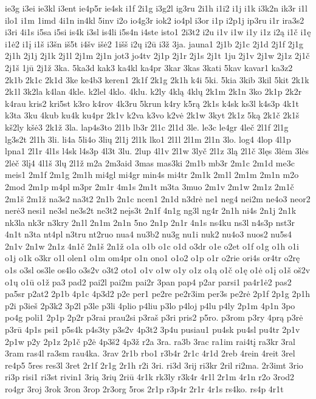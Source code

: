 {ie3g
i3ei
ie3kl
i3ent
ie4p5r
ie4sk
i1f
2i1g
i3g2l
ig3ru
2i1h
i1i2
i1j
i1k
i3k2n
ik3r
i1l
ilo1
i1m
1imd
4i1n
in4kl
5inv
i2o
io4g3r
iok2
io4pl
i3or
i1p
i2p1j
ip3ru
i1r
ira3s2
i3ri
4i1s
i5sa
i5si
is4k
i3sl
is4li
i5s4n
i4ste
isto1
2i3t2
i2u
i1v
i1w
i1y
i1z
i2ą
i1č
i1ę
i1ė2
i1į
i1š
i3šn
iš5t
i4šv
išė2
1išš
i2ų
i2ū
i3ž
3ja.
jauna1
2j1b
2j1c
2j1d
2j1f
2j1g
2j1h
2j1j
2j1k
2j1l
2j1m
2j1n
jot3
jo4tv
2j1p
2j1r
2j1s
2j1t
1ju
2j1v
2j1w
2j1z
2j1č
2j1š
1jū
2j1ž
3ka.
5ka3d
kak3
ka4kl
ka4pr
3kar
3kas
3kati
5kav
kavar1
ka3z2
2k1b
2k1c
2k1d
3ke
ke4b3
keren1
2k1f
2k1g
2k1h
k4i
5ki.
5kia
3kib
3kil
5kit
2k1k
2k1l
3k2la
k4lan
4kle.
k2lel
4klo.
4klu.
k2ly
4klą
4klų
2k1m
2k1n
3ko
2k1p
2k2r
k4rau
kris2
kri5st
k3ro
k4rov
4k3ru
5krun
k4ry
k5rą
2k1s
k4sk
ks3l
k4s3p
4k1t
k3ta
3ku
4kub
ku4k
ku4pr
2k1v
k2va
k3vo
k2vė
2k1w
3kyt
2k1z
5ką
2k1č
2k1š
kš2ly
kšė3
2k1ž
3la.
lap4s3to
2l1b
lb3r
2l1c
2l1d
3le.
le3c
le4gr
4leč
2l1f
2l1g
lg3s2t
2l1h
3li.
li4a
5li4o
3lių
2l1j
2l1k
lko1
2l1l
2l1m
2l1n
3lo.
log4
4lop
4l1p
lpna1
2l1r
4l1s
l4sk
l4s3p
4l3t
3lu.
2lup
4l1v
2l1w
3lyč
2l1z
3lą
2l1č
3lęs
3lėm
3lės
2lėč
3lį4
4l1š
3lų
2l1ž
m2a
2m3aid
3mas
mas3ki
2m1b
mb3r
2m1c
2m1d
me3c
meis1
2m1f
2m1g
2m1h
mi4gl
mi4gr
min4s
mi4tr
2m1k
2m1l
2m1m
2m1n
m2o
2mod
2m1p
m4pl
m3pr
2m1r
4m1s
2m1t
m3ta
3muo
2m1v
2m1w
2m1z
2m1č
2m1š
2m1ž
na3s2
na3t2
2n1b
2n1c
ncen1
2n1d
n3drė
ne1
neg4
nei2m
ne4o3
neor2
nerė3
nesi1
ne3sl
ne3s2t
ne3t2
neįs3t
2n1f
4n1g
ng3l
ng4r
2n1h
ni4s
2n1j
2n1k
nk3la
nk3r
n3kry
2n1l
2n1m
2n1n
5no
2n1p
2n1r
4n1s
ns4ku
ns3l
n4s3p
nst3r
4n1t
n3ta
nt4pl
n3tru
nt2ruo
nua4
nu3b2
nu3g
nu1i
nuk2
nu4o3
nuos2
nu5s4
2n1v
2n1w
2n1z
4n1č
2n1š
2n1ž
o1a
o1b
o1c
o1d
o3dr
o1e
o2et
o1f
o1g
o1h
o1i
o1j
o1k
o3kr
o1l
olen1
o1m
om4pr
o1n
ono1
o1o2
o1p
o1r
o2rie
ori4s
or4tr
o2rę
o1s
o3sl
os3le
os4lo
o3s2v
o3t2
oto1
o1v
o1w
o1y
o1z
o1ą
o1č
o1ę
o1ė
o1į
o1š
oš2v
o1ų
o1ū
o1ž
pa3
pad2
pai2l
pai2m
pai2r
3pan
pap4
p2ar
parsi1
pa4r1ė2
pas2
pa5sr
p2at2
2p1b
4p1c
4p3d2
p2e
per1
pe2re
pe2r3im
per3s
pe2rė
2p1f
2p1g
2p1h
p2i
p3ieš
2p3k2
3p2l
p3le
p3li
4plio
p4liu
p3lo
p4loj
p4lu
p4ly
2p1m
4p1n
3po
po4g
poli1
2p1p
2p2r
p3rai
prau2si
p3raš
p3ri
pris2
p5ro.
p3rom
p3ry
4prą
p3rė
p3rū
4p1s
psi1
p5s4k
p4s3ty
p3s2v
4p3t2
3p4u
pusiau1
pu4sk
pu4sl
pu4tr
2p1v
2p1w
p2y
2p1z
2p1č
p2ė
4p3š2
4p3ž
r2a
3ra.
ra3b
3rac
ra1im
rai4tį
ra3kr
3ral
3ram
ras4l
ra3sm
rau4ka.
3rav
2r1b
rbo1
r3b4r
2r1c
4r1d
2reb
4rein
4reit
3rel
re4p5
5res
res3l
3ret
2r1f
2r1g
2r1h
r2i
3ri.
ri3d
3rij
ri3kr
2ril
ri2ma.
2r3imt
3rio
ri3p
risi1
ri3st
rivin1
3rią
3rių
2riū
4r1k
rk3ly
r3k4r
4r1l
2r1m
4r1n
r2o
3rod2
ro4gr
3roj
3rok
3ron
3rop
2r3org
5ros
2r1p
r3p4r
2r1r
4r1s
rs4ko.
rs4p
4r1t
}
